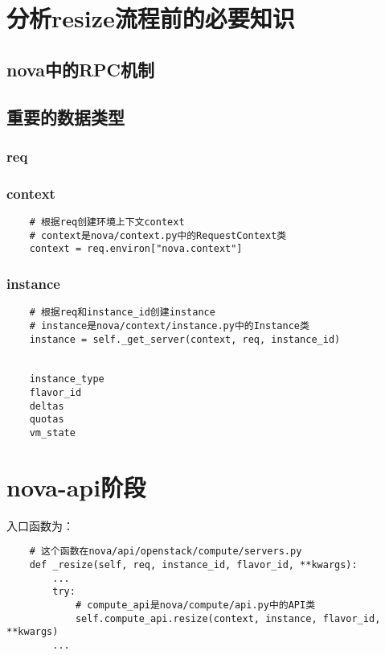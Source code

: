 \documentclass[a4paper,left=1.5cm,right=1.5cm,11pt]{article}
\begin{document}
\tableofcontents

\clearpage

\section{分析resize流程前的必要知识}
\subsection{nova中的RPC机制}
\subsection{重要的数据类型}
\subsubsection{req}
\subsubsection{context}
	\begin{lstlisting}
	# 根据req创建环境上下文context
	# context是nova/context.py中的RequestContext类
	context = req.environ["nova.context"]
	\end{lstlisting}

\subsubsection{instance}
	\begin{lstlisting}
	# 根据req和instance_id创建instance
	# instance是nova/context/instance.py中的Instance类
	instance = self._get_server(context, req, instance_id)	


	instance_type
	flavor_id
	deltas
	quotas
	vm_state
	\end{lstlisting}

\section{nova-api阶段}
	入口函数为：
	\begin{lstlisting}
	# 这个函数在nova/api/openstack/compute/servers.py
	def _resize(self, req, instance_id, flavor_id, **kwargs):
		...
        try:
			# compute_api是nova/compute/api.py中的API类
            self.compute_api.resize(context, instance, flavor_id, **kwargs)
        ...
	\end{lstlisting}
\end{document}
